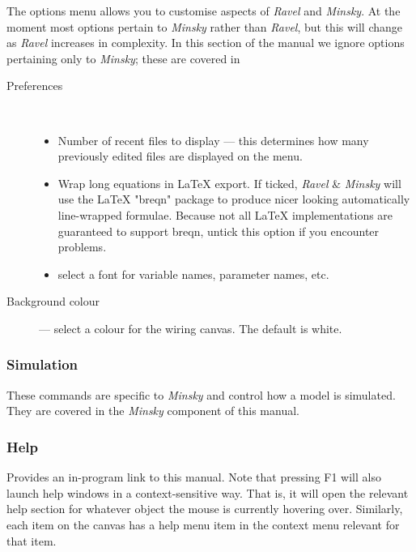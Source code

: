 The options menu allows you to customise aspects of \emph{Ravel} and
\emph{Minsky}. At the moment most options pertain to \emph{Minsky}
rather than \emph{Ravel}, but this will change as \emph{Ravel} increases
in complexity. In this section of the manual we ignore options pertaining
only to \emph{Minsky}; these are covered in 
\begin{description}
\item [{Preferences}] %
\mbox{%
%
}
\begin{itemize}
\item Number of recent files to display --- this determines how many previously
edited files are displayed on the 
menu. 
\item \label{wrap-equations} Wrap long equations in LaTeX export. If ticked,
\emph{Ravel} \& \emph{Minsky} will use the LaTeX "breqn" package
to produce nicer looking automatically line-wrapped formulae. Because
not all LaTeX implementations are guaranteed to support breqn, untick
this option if you encounter problems. 
\item \label{font} select a font for variable names, parameter names, etc. 
\end{itemize}
\item [{Background colour}] --- select a colour for the wiring canvas.
The default is white.
\end{description}

\subsubsection{Simulation}

These commands are specific to \emph{Minsky} and control how a model
is simulated. They are covered in the \emph{Minsky} component of this
manual. 

\subsubsection{Help}

\label{Help}

Provides an in-program link to this manual. Note that pressing F1
will also launch help windows in a context-sensitive way. That is,
it will open the relevant help section for whatever object the mouse
is currently hovering over. Similarly, each item on the canvas has
a help menu item in the context menu relevant for that item.

